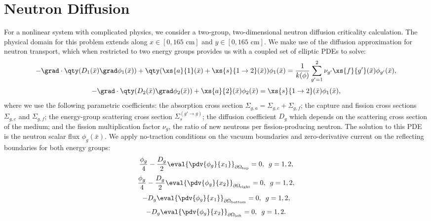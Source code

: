 \section{Neutron Diffusion}
For a nonlinear system with complicated physics, we consider a two-group, two-dimensional neutron diffusion
criticality calculation.  The physical domain for this problem extends along $x\in[0,165\text{ cm}]$ and
$y\in[0,165\text{ cm}]$.
We make use of the diffusion approximation for neutron transport, which when restricted to two energy groups provides us
with a coupled set of elliptic PDEs to solve:
\begin{equation}
-\grad\cdot\qty( D_1(\bar x)\grad\phi_1(\bar x))+\qty(\xs{a}{1}(\bar x)+\xs{s}{1\to2}(\bar x))\phi_1(\bar x) = \frac{1}{k(\phi)}\sum_{g'=1}^2\nu_{g'}\xs{f}{g'}(\bar x)\phi_{g'}(\bar x),
\end{equation}
\begin{equation}
-\grad \cdot\qty(D_2(\bar x)\grad \phi_2(\bar x))+\xs{a}{2}(\bar x)\phi_2(\bar x) = \xs{s}{1\to 2}(\bar x)\phi_1(\bar x),
\end{equation}
where we use the following parametric coefficients: 
the absorption cross section $\Sigma_{g,a}=\Sigma_{g,c}+\Sigma_{g,f}$; 
the capture and fission cross sections $\Sigma_{g,c}$ and $\Sigma_{g,f}$; 
the energy-group scattering cross section $\Sigma_s^{(g'\to g)}$; 
the diffusion coefficient $D_g$ which depends on the scattering cross section of the medium;
and the fission multiplication factor $\nu_g$, the ratio of new neutrons per fission-producing neutron.  The
solution to this PDE is the neutron scalar flux $\phi_g(\bar x)$.  We apply no-traction conditions on the
vacuum boundaries and zero-derivative current on the reflecting boundaries for both energy groups:
\begin{equation}
\frac{\phi_g}{4}-\frac{D_g}{2}\eval{\pdv{\phi_g}{x_1}}_{\partial \Omega_\text{top}}=0,\hspace{5pt} g=1,2,
\end{equation}
\begin{equation}
\frac{\phi_g}{4}-\frac{D_g}{2}\eval{\pdv{\phi_g}{x_2}}_{\partial \Omega_\text{right}}=0,\hspace{5pt} g=1,2,
\end{equation}
\begin{equation}
-D_g\eval{\pdv{\phi_g}{x_1}}_{\partial \Omega_\text{bottom}}=0,\hspace{5pt} g=1,2,
\end{equation}
\begin{equation}
-D_g\eval{\pdv{\phi_g}{x_2}}_{\partial \Omega_\text{left}}=0,\hspace{5pt} g=1,2.
\end{equation}

